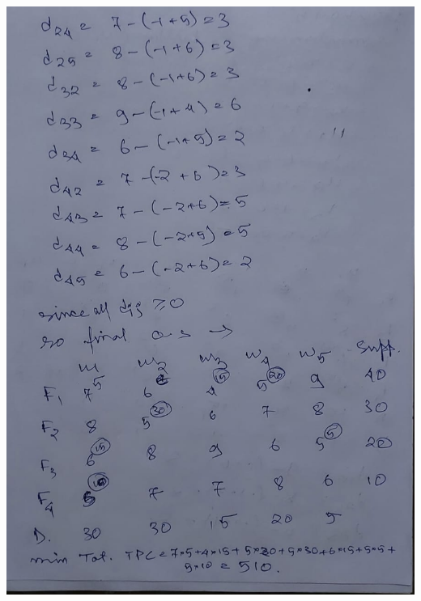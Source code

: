 \documentclass[12pt, letterpaper, twoside]{book}
\begin{document}
\includegraphics[width=\paperwidth, height=\paperheight]{Page19}
\end{document}
